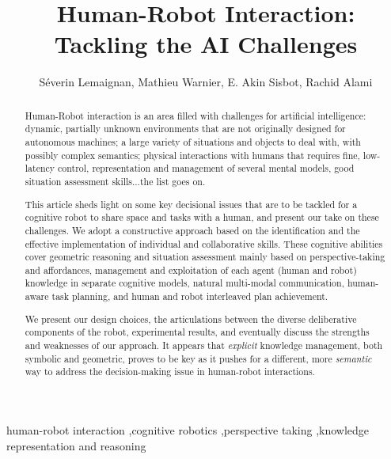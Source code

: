 \documentclass[preprint,3p,times]{elsarticle}
\begin{document}
\begin{frontmatter}

\title{\LARGE \bf
Human-Robot Interaction: Tackling the AI Challenges
}

\author{Séverin Lemaignan, Mathieu Warnier, E. Akin Sisbot, Rachid Alami}

\address{
CNRS, LAAS, 7 avenue du Colonel Roche, F-31400 Toulouse, France\\
Univ de Toulouse, LAAS, F-31400 Toulouse, France\\
{\tt firstname.lastname@laas.fr}
}




\begin{abstract}

Human-Robot interaction is an area filled with challenges for artificial
intelligence: dynamic, partially unknown environments that are not originally
designed for autonomous machines; a large variety of situations and objects to
deal with, with possibly complex semantics; physical interactions with humans
that requires fine, low-latency control, representation and management of
several mental models, good situation assessment skills...the list goes on.

This article sheds light on some key decisional issues that are to be tackled
for a cognitive robot to share space and tasks with a human, and present our
take on these challenges. We adopt a constructive approach based on the
identification and the effective implementation of individual and collaborative
skills. These cognitive abilities cover geometric reasoning and situation
assessment mainly based on perspective-taking and affordances, management and
exploitation of each agent (human and robot) knowledge in separate cognitive
models, natural multi-modal communication, human-aware task planning, and human
and robot interleaved plan achievement.

We present our design choices, the articulations between the diverse
deliberative components of the robot, experimental results, and eventually
discuss the strengths and weaknesses of our approach. It appears that
\emph{explicit} knowledge management, both symbolic and geometric, proves to be
key as it pushes for a different, more \emph{semantic} way to address the
decision-making issue in human-robot interactions.

\end{abstract}

\begin{keyword}
    human-robot interaction \sep cognitive robotics \sep perspective taking \sep knowledge representation and reasoning
\end{keyword}

\end{frontmatter}
\end{document}
